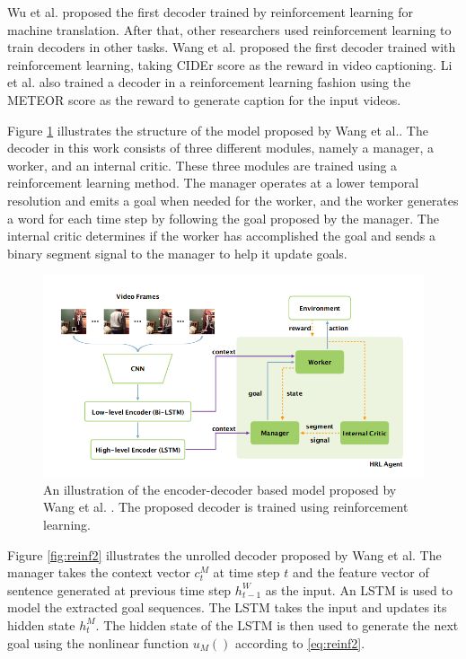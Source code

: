 \documentclass[preprint, 10pt]{elsarticle}
\begin{document}
		Wu et al. \cite{wu2016google} proposed the first decoder trained by reinforcement learning for machine translation. After that, other researchers used reinforcement learning to train decoders in other tasks. Wang et al. \cite{wang2018video} proposed the first decoder trained with reinforcement learning, taking CIDEr\cite{vedantam2015cider} score as the reward in video captioning. Li et al. \cite{li2018jointly} also trained a decoder in a reinforcement learning fashion using the METEOR \cite{banerjee2005meteor} score as the reward to generate caption for the input videos. 
		
		Figure \ref{fig:reinf1} illustrates the structure of the model proposed by Wang et al.\cite{wang2018video}. The decoder in this work consists of three different modules, namely a manager, a worker, and an internal critic. These three modules are trained using a reinforcement learning method. The manager operates at a lower temporal resolution and emits a goal when needed for the worker, and the worker generates a word for each time step by following the goal proposed by the manager. The internal critic determines if the worker has accomplished the goal and sends a binary segment signal to the manager to help it update goals. 
		
		\begin{figure}[h]
			\centering
			\includegraphics[scale=0.5]{Imgs/reinf1.png}
			\caption{An illustration of the encoder-decoder based model proposed by Wang et al. \cite{wang2018video}. The proposed decoder is trained using reinforcement learning.}
			\label{fig:reinf1}
		\end{figure}
	
		Figure \ref{fig:reinf2} illustrates the unrolled decoder proposed by Wang et al. The manager takes the context vector $c_t^M$ at time step $t$ and the feature vector of sentence generated at previous time step $h_{t-1}^W$ as the input. An LSTM is used to model the extracted goal sequences. The LSTM takes the input and updates its hidden state $h_t^M$. The hidden state of the LSTM is then used to generate the next goal using the nonlinear function $u_M()$ according to \eqref{eq:reinf2}.
		
\end{document}
